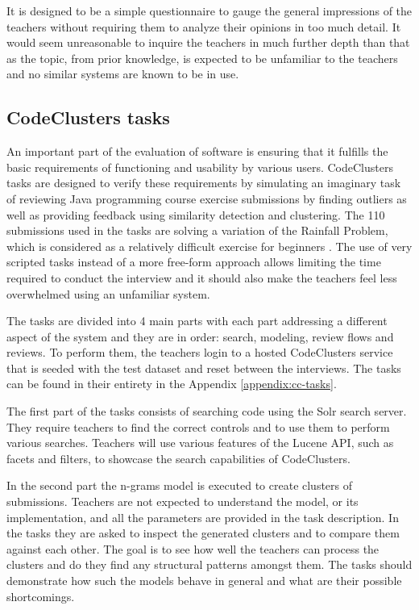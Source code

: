 It is designed to be a simple questionnaire to gauge the general impressions of the teachers without requiring them to analyze their opinions in too much detail. It would seem unreasonable to inquire the teachers in much further depth than that as the topic, from prior knowledge, is expected to be unfamiliar to the teachers and no similar systems are known to be in use.

\subsection{CodeClusters tasks}

An important part of the evaluation of software is ensuring that it fulfills the basic requirements of functioning and usability by various users. CodeClusters tasks are designed to verify these requirements by simulating an imaginary task of reviewing Java programming course exercise submissions by finding outliers as well as providing feedback using similarity detection and clustering. The 110 submissions used in the tasks are solving a variation of the Rainfall Problem, which is considered as a relatively difficult exercise for beginners \cite{rainfall-2015}. The use of very scripted tasks instead of a more free-form approach allows limiting the time required to conduct the interview and it should also make the teachers feel less overwhelmed using an unfamiliar system.

The tasks are divided into 4 main parts with each part addressing a different aspect of the system and they are in order: search, modeling, review flows and reviews. To perform them, the teachers login to a hosted CodeClusters service that is seeded with the test dataset and reset between the interviews. The tasks can be found in their entirety in the Appendix \ref{appendix:cc-tasks}.

The first part of the tasks consists of searching code using the Solr search server. They require teachers to find the correct controls and to use them to perform various searches. Teachers will use various features of the Lucene API, such as facets and filters, to showcase the search capabilities of CodeClusters. 

In the second part the n-grams model is executed to create clusters of submissions. Teachers are not expected to understand the model, or its implementation, and all the parameters are provided in the task description. In the tasks they are asked to inspect the generated clusters and to compare them against each other. The goal is to see how well the teachers can process the clusters and do they find any structural patterns amongst them. The tasks should demonstrate how such the models behave in general and what are their possible shortcomings.

